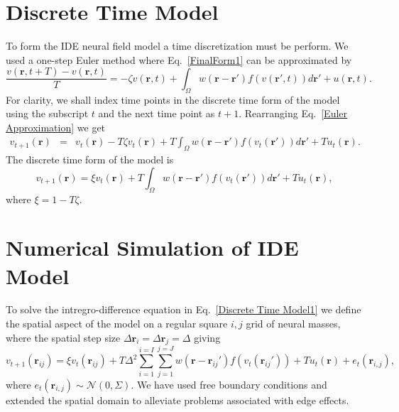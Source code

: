 \documentclass[12pt]{iopart}		%
\begin{document}
\section{Discrete Time Model}\label{Time Discretization}
To form the IDE neural field model a time discretization must be perform. We used a one-step Euler method where Eq.~\ref{FinalForm1} can be approximated by
\begin{equation}\label{Euler Approximation}	
\frac{v\left( \mathbf{r},t+T \right) - v\left( \mathbf{r},t\right)}{T} =   -\zeta v\left( \mathbf{r},t \right) + \int_\Omega  {w\left( \mathbf{r}-\mathbf{r}' \right)f\left( {v\left( \mathbf{r}',t \right)} \right)d\mathbf{r}'} + u\left(\mathbf{r},t\right).
\end{equation}
For clarity, we shall index time points in the discrete time form of the model using the subscript $t$ and the next time point as $t+1$. Rearranging Eq.~\ref{Euler Approximation} we get
\begin{eqnarray}\label{Euler Approximation}	
v_{t+1}\left( \mathbf{r}\right) &=& v_t\left( \mathbf{r}\right) -T \zeta v_t\left( \mathbf{r}\right) + T \int_\Omega  {w\left( \mathbf{r}-\mathbf{r}' \right)f\left( {v_t\left( \mathbf{r}'\right)} \right)d\mathbf{r}'} + T u_t\left(\mathbf{r}\right).
\end{eqnarray}
The discrete time form of the model is
\begin{equation}\label{Discrete Time Model1}
	v_{t+1}\left(\mathbf{r}\right) = \xi v_t\left(\mathbf{r}\right) + T \int_\Omega { w\left(\mathbf{r}-\mathbf{r}'\right) f\left(v_t\left(\mathbf{r}'\right)\right) d\mathbf{r}'} + T u_t\left(\mathbf{r}\right),
\end{equation}
where $\xi = 1 - T \zeta$.
 \section{Numerical Simulation of IDE Model}\label{Space Discretization}
To solve the intregro-difference equation in Eq.~\ref{Discrete Time Model1} we define the spatial aspect of the model on a regular square $i,j$ grid of neural masses, where the spatial step size $\Delta \mathbf{r}_i = \Delta \mathbf{r}_j = \Delta $ giving
\begin{equation}\label{discrete space}
	v_{t+1}\left(\mathbf{r}_{ij}\right) = \xi v_t\left(\mathbf{r}_{ij}\right) + T \Delta^2 \sum_{i=1}^{i=I}{ \sum_{j=1}^{j=J}{ w\left( \mathbf{r}-\mathbf{r}_{ij}' \right)f\left( v_t\left( \mathbf{r}_{ij}'\right) \right)} } + T u_t\left(\mathbf{r}\right) + e_t(\mathbf{r}_{i,j}),
\end{equation}
where $e_t(\mathbf{r}_{i,j}) \sim \mathcal{N}\left(0,\Sigma\right)$.
We have used free boundary conditions and extended the spatial domain to alleviate problems associated with edge effects.
\end{document}
